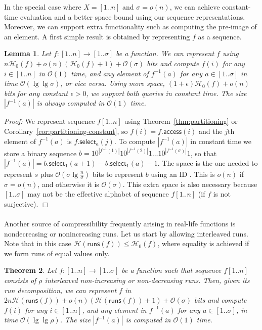 \documentclass[11pt]{article}
\newtheorem{theorem}{Theorem}
\newtheorem{lemma}[theorem]{Lemma}
\newenvironment{proof}{\textit{Proof:}}{\hfill$\Box$ \paragraph{} }
\newcommand{\Oh}[1]
    {\ensuremath{\mathcal{O}\left( {#1} \right)}}
\newcommand{\access}
    {\ensuremath{\mathsf{access}}}
\newcommand{\select}
    {\ensuremath{\mathsf{select}}}
\newcommand{\runs}
    {\ensuremath{\mathsf{runs}}}
\newcommand{\HH}{\mathcal{H}}
\newcommand{\Ho}{\HH_0}
\begin{document}
In the special case where \(X = [1..n]\) and \(\sigma = o(n)\), 
we can achieve constant-time evaluation and a better space
bound using our sequence representations. Moreover, we can support extra
functionality such as computing the pre-image of an element.
A first simple result is obtained by representing $f$ as a sequence.

\begin{lemma} \label{lem:string_function}
Let \(f: [1..n] \rightarrow [1..\sigma]\) be a function.
We can represent $f$ using $n\Ho(f) + o(n)(\Ho(f)+1)+\Oh{\sigma}$ bits and
compute $f(i)$ for any $i\in[1..n]$ in $\Oh{1}$ time, and any element of 
$f^{-1}(a)$ for any $a\in[1..\sigma]$ in time $\Oh{\lg\lg\sigma}$, or vice 
versa.  Using more space, $(1+\epsilon)\Ho(f) + o(n)$ bits for any constant 
$\epsilon>0$, we support both queries in constant time.
The size $|f^{-1}(a)|$ is always computed in $\Oh{1}$ time.
\end{lemma}
\begin{proof}
We represent sequence $f[1..n]$ using Theorem~\ref{thm:partitioning} or
Corollary~\ref{cor:partitioning-constant},
so $f(i) = f.\access(i)$ and the $j$th element of $f^{-1}(a)$ is
$f.\select_a(j)$. To compute $|f^{-1}(a)|$ in constant time we store a
binary sequence
$b = 10^{|f^{-1}(1)|}10^{|f^{-1}(2)|}1\ldots 10^{|f^{-1}(\sigma)|}1$, so
that $|f^{-1}(a)| = b.\select_1(a+1)-b.\select_1(a)-1$. The space is the one
needed to represent $s$ plus $\Oh{\sigma\lg\frac{n}{\sigma}}$ bits to 
represent $b$ using an ID 
\cite{RRR02}. This is $o(n)$ if $\sigma=o(n)$,
and otherwise it is $\Oh{\sigma}$. This extra space is also necessary
because $[1..\sigma]$ may not be the effective alphabet of sequence $f[1..n]$
(if $f$ is not surjective).
\end{proof}

Another source of compressibility frequently arising in real-life functions
is nondecreasing or nonincreasing runs. Let us start by allowing interleaved 
runs. Note that in this case $\HH(\runs(f)) \le \Ho(f)$, where 
equality is achieved if we form runs of equal values only. 

\begin{theorem} \label{thm:function}
  Let \(f: [1..n] \rightarrow [1..\sigma]\) be a 
  function such that sequence $f[1..n]$ consists of
  $\rho$ interleaved non-increasing or non-decreasing runs.
  Then, given its run decomposition,
   we can represent $f$ in \(2 n \HH (\runs (f)) + o (n)(\HH (\runs (f)) +
  1) + \Oh{\sigma}\) bits and compute $f(i)$ for any $i \in [1..n]$, and
  any element in $f^{-1}(a)$ for any $a \in [1..\sigma]$,
  in time $\Oh{\lg\lg\rho}$.
  The size $|f^{-1}(a)|$ is computed in $\Oh{1}$ time.
\end{theorem}
\end{document}
